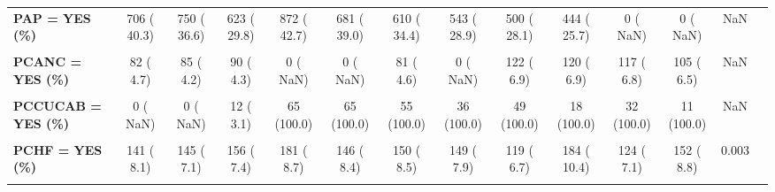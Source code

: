 \documentclass[
]{article}
\begin{document}
\begin{table}[H]
\begin{tabular}[t]{>{\raggedright\arraybackslash}p{5em}ccccccccccccc}
\textbf{PAP = YES (\%)} & 706 ( 40.3) & 750 ( 36.6) & 623 ( 29.8) & 872 ( 42.7) & 681 ( 39.0) & 610 ( 34.4) & 543 ( 28.9) & 500 ( 28.1) & 444 ( 25.7) & 0 (  NaN) & 0 (  NaN) & NaN & \\
\textbf{\cellcolor{gray!10}{PCABG = YES (\%)}} & \cellcolor{gray!10}{154 (  8.8)} & \cellcolor{gray!10}{207 ( 10.1)} & \cellcolor{gray!10}{233 ( 11.1)} & \cellcolor{gray!10}{234 ( 11.3)} & \cellcolor{gray!10}{171 (  9.8)} & \cellcolor{gray!10}{177 ( 10.0)} & \cellcolor{gray!10}{172 (  9.1)} & \cellcolor{gray!10}{158 (  8.8)} & \cellcolor{gray!10}{162 (  9.1)} & \cellcolor{gray!10}{128 (  7.3)} & \cellcolor{gray!10}{98 (  5.7)} & \cellcolor{gray!10}{<0.001} & \cellcolor{gray!10}{}\\
\textbf{PCANC = YES (\%)} & 82 (  4.7) & 85 (  4.2) & 90 (  4.3) & 0 (  NaN) & 0 (  NaN) & 81 (  4.6) & 0 (  NaN) & 122 (  6.9) & 120 (  6.9) & 117 (  6.8) & 105 (  6.5) & NaN & \\
\textbf{\cellcolor{gray!10}{PCCUANG = YES (\%)}} & \cellcolor{gray!10}{0 (  NaN)} & \cellcolor{gray!10}{0 (  NaN)} & \cellcolor{gray!10}{40 ( 10.3)} & \cellcolor{gray!10}{45 (100.0)} & \cellcolor{gray!10}{16 (100.0)} & \cellcolor{gray!10}{21 (100.0)} & \cellcolor{gray!10}{9 (100.0)} & \cellcolor{gray!10}{13 (100.0)} & \cellcolor{gray!10}{2 (100.0)} & \cellcolor{gray!10}{4 (100.0)} & \cellcolor{gray!10}{2 (100.0)} & \cellcolor{gray!10}{NaN} & \cellcolor{gray!10}{}\\
\textbf{PCCUCAB = YES (\%)} & 0 (  NaN) & 0 (  NaN) & 12 (  3.1) & 65 (100.0) & 65 (100.0) & 55 (100.0) & 36 (100.0) & 49 (100.0) & 18 (100.0) & 32 (100.0) & 11 (100.0) & NaN & \\
\textbf{\cellcolor{gray!10}{PCCUPCI = YES (\%)}} & \cellcolor{gray!10}{0 (  NaN)} & \cellcolor{gray!10}{0 (  NaN)} & \cellcolor{gray!10}{24 (  6.2)} & \cellcolor{gray!10}{37 (100.0)} & \cellcolor{gray!10}{20 (100.0)} & \cellcolor{gray!10}{12 (100.0)} & \cellcolor{gray!10}{9 (100.0)} & \cellcolor{gray!10}{9 (100.0)} & \cellcolor{gray!10}{2 (100.0)} & \cellcolor{gray!10}{2 (100.0)} & \cellcolor{gray!10}{1 (100.0)} & \cellcolor{gray!10}{NaN} & \cellcolor{gray!10}{}\\
\textbf{PCHF = YES (\%)} & 141 (  8.1) & 145 (  7.1) & 156 (  7.4) & 181 (  8.7) & 146 (  8.4) & 150 (  8.5) & 149 (  7.9) & 119 (  6.7) & 184 ( 10.4) & 124 (  7.1) & 152 (  8.8) & 0.003 & \\
\textbf{\cellcolor{gray!10}{PCI = YES (\%)}} & \cellcolor{gray!10}{125 ( 21.2)} & \cellcolor{gray!10}{276 ( 45.1)} & \cellcolor{gray!10}{479 ( 69.8)} & \cellcolor{gray!10}{436 ( 73.2)} & \cellcolor{gray!10}{442 ( 87.4)} & \cellcolor{gray!10}{519 ( 92.8)} & \cellcolor{gray!10}{568 ( 93.4)} & \cellcolor{gray!10}{565 ( 93.4)} & \cellcolor{gray!10}{549 ( 30.9)} & \cellcolor{gray!10}{702 ( 40.1)} & \cellcolor{gray!10}{610 ( 34.8)} & \cellcolor{gray!10}{<0.001} & \cellcolor{gray!10}{}\\

\end{tabular}
\end{table}
\end{document}
